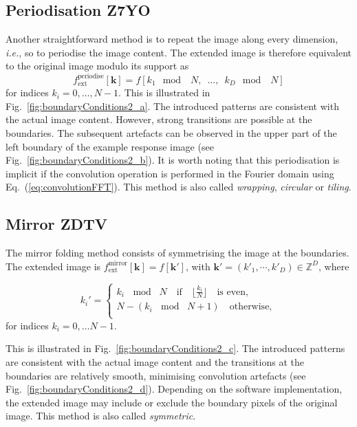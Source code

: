 \documentclass[fleqn,a4paper,oneside,openany]{book}
\newcommand\id[1]{{\hfill\normalsize{\idfont #1}}}
\renewcommand{\marginnote}[2][]{}
\begin{document}
\subsection[Periodisation]{Periodisation \id{Z7YO}}
%
Another straightforward method is to repeat the image along every dimension, \emph{i.e.}, so to periodise the image content.
The extended image is therefore equivalent to the original image modulo its support as
$$f_{\text{ext}}^{\text{periodise}}[\boldsymbol{k}]=f[k_1\mod\,\,\, N,\,\,\, \dots,\,\,\, k_D\mod\,\,\, N]$$
for indices $k_i = 0,\dots, N-1$.
This is illustrated in Fig.~\ref{fig:boundaryConditions2_a}.
The introduced patterns are consistent with the actual image content. 
However, strong transitions are possible at the boundaries.
The subsequent artefacts can be observed in the upper part of the left boundary of the example response image (see Fig.~\ref{fig:boundaryConditions2_b}).
It is worth noting that this periodisation is implicit if the convolution operation is performed in the Fourier domain using Eq.~(\ref{eq:convolutionFFT}).
This method is also called \textit{wrapping}, \textit{circular} or \textit{tiling}.
%
\subsection[Mirror]{Mirror \id{ZDTV}}
\marginnote{\footnotesize v5: Clarified use of mirror boundary condition by the IBSI.}
The mirror folding method consists of symmetrising the image at the boundaries. The extended image is
$f_{\text{ext}}^{\text{mirror}}[\boldsymbol{k}]=f[\boldsymbol{k'}]$, with $\boldsymbol{k'} = (k'_1,\cdots,k'_D) \in \mathbb{Z}^D$, where

$$
k_i'=
\begin{cases}
  k_i \,\mod\,\, N \quad\text{if}\quad \lfloor \frac{k_i}{N}\rfloor\quad\text{is even},\\
  N - (k_i \,\mod\,\, N+1) \quad \text{otherwise},\\
 \end{cases}$$
for indices $k_i = 0,\dots N-1$.

This is illustrated in Fig.~\ref{fig:boundaryConditions2_c}.
The introduced patterns are consistent with the actual image content and the transitions at the boundaries are relatively smooth, minimising convolution artefacts (see Fig.~\ref{fig:boundaryConditions2_d}).
Depending on the software implementation, the extended image may include or exclude the boundary pixels of the original image.
This method is also called \textit{symmetric}.
\end{document}
